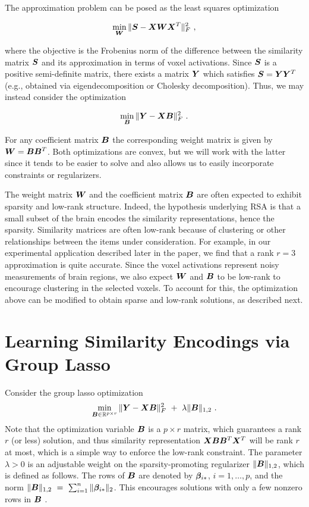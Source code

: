 The approximation problem can be posed as the least squares optimization

$$\min_{\bW} \|\bS-\bX\bW\bX^T\|_F^2 \ , $$

where the objective is the Frobenius norm of the difference between the similarity matrix
$\boldsymbol{S}$ and its approximation in terms of voxel activations. Since $\boldsymbol{S}$ is a positive
semi-definite matrix, there exists a matrix $\boldsymbol{Y}$ which satisfies $\boldsymbol{S}=\boldsymbol{Y}\boldsymbol{Y}^T$ (e.g.,
obtained via eigendecomposition or Cholesky decomposition). Thus, we may instead consider
the optimization

$$\min_{\bB} \|\bY-\bX\bB\|_F^2 \ . $$

For any coefficient matrix $\boldsymbol{B}$ the corresponding weight matrix is given by $\boldsymbol{W} =
\boldsymbol{B}\boldsymbol{B}^T$. Both optimizations are convex, but we will work with the latter since it tends
to be easier to solve and also allows us to easily incorporate constraints or
regularizers.

The weight matrix $\boldsymbol{W}$ and the coefficient matrix $\boldsymbol{B}$ are often expected to exhibit
sparsity and low-rank structure. Indeed, the hypothesis underlying RSA is that a small
subset of the brain encodes the similarity representations, hence the sparsity.
Similarity matrices are often low-rank because of clustering or other relationships
between the items under consideration. For example, in our experimental application
described later in the paper, we find that a rank $r=3$ approximation is quite accurate.
Since the voxel activations represent noisy measurements of brain regions, we also expect
$\boldsymbol{W}$ and $\boldsymbol{B}$ to be low-rank to encourage clustering in the selected voxels. To account
for this, the optimization above can be modified to obtain sparse and low-rank solutions,
as described next.



\section{Learning Similarity Encodings via Group Lasso}

Consider the group lasso optimization
\begin{equation}\label{eqn.grouplasso}
 \min_{\bB\in \R^{p\times r}} \|\bY-\bX\bB\|_F^2 \ + \ \lambda \|\bB\|_{1,2} \ .
 \end{equation}
Note that the optimization variable $\boldsymbol{B}$ is a $p\times r$ matrix, which guarantees a rank
$r$ (or less) solution, and thus similarity representation $\boldsymbol{X}\boldsymbol{B}\boldsymbol{B}^T\boldsymbol{X}^T$ will be rank
$r$ at most, which is a simple way to enforce the low-rank constraint. The parameter
$\lambda>0$ is an adjustable weight on the sparsity-promoting regularizer
$\|\boldsymbol{B}\|_{1,2}$, which is defined as follows. The rows of $\boldsymbol{B}$ are denoted by
$\boldsymbol{\beta}_{i{\ast}}$, $i=1,\dots,p$, and the norm
$\|\boldsymbol{B}\|_{1,2} \ = \ \sum_{i=1}^n \|\boldsymbol{\beta}_{i{\ast}}\|_2$. This encourages solutions with only
a few nonzero rows in $\boldsymbol{B}$ \cite{obo11,lounici,vandegeer}.

